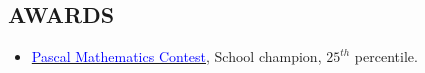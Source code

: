 \documentclass[margin]{res}
\begin{document}
\begin{resume}
	\section{\textcolor{NavyBlue}{AWARDS}}
	\begin{itemize}
		\item 	\href{https://www.cemc.uwaterloo.ca/contests/pcf.html}{\textcolor{blue}{Pascal Mathematics Contest}}, School champion, $25^{th}$ percentile.
	\end{itemize}
\end{resume}
\end{document}
